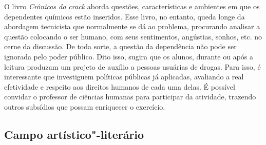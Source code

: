 \documentclass[12pt]{extarticle}
\begin{document}

O livro \emph{Crônicas do crack} aborda questões, características e
ambientes em que os dependentes químicos estão inseridos. Esse livro,
no entanto, queda longe da abordagem tecnicista que normalmente se dá
ao problema, procurando analisar a questão colocando o ser humano, com
seus sentimentos, angústias, sonhos, etc. no cerne da discussão. De
toda sorte, a questão da dependência não pode ser ignorada pelo poder
público. Dito isso, sugira que os alunos, durante ou após a leitura
produzam um projeto de auxílio a pessoas usuárias de drogas. Para
isso, é interessante que investiguem políticas públicas já aplicadas,
avaliando a real efetividade e respeito aos direitos humanos de cada
uma delas. É possível convidar o professor de ciências humanas para
participar da atividade, trazendo outros subsídios que possam
enriquecer o exercício.


\subsection{Campo artístico"-literário}


\end{document}
